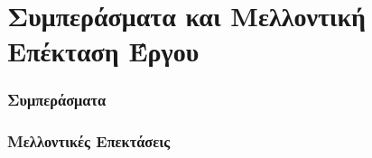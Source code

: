 

    

\chapter{Συμπεράσματα και Μελλοντική Επέκταση Έργου}

\subsection{Συμπεράσματα}
\subsection{Μελλοντικές Επεκτάσεις}
\clearpage
